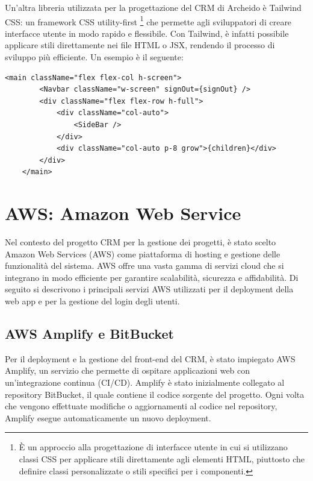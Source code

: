 \documentclass[target=bach,aauheader=,style=]{thud}
\begin{document}
\noindent Un'altra libreria utilizzata per la progettazione del CRM di Archeido è Tailwind CSS: un framework CSS utility-first \footnote{È un approccio alla progettazione di interfacce utente in cui si utilizzano classi CSS per applicare stili direttamente agli elementi HTML, piuttosto che definire classi personalizzate o stili specifici per i componenti.} che permette agli sviluppatori di creare interfacce utente in modo rapido e flessibile. Con Tailwind, è infatti possibile applicare stili direttamente nei file HTML o JSX, rendendo il processo di sviluppo più efficiente. Un esempio è il seguente:

\begin{lstlisting}[caption=Parte del file \texttt{app.tsx} del CRM]
    <main className="flex flex-col h-screen">
        <Navbar className="w-screen" signOut={signOut} />
        <div className="flex flex-row h-full">
            <div className="col-auto">
                <SideBar />
            </div>
            <div className="col-auto p-8 grow">{children}</div>
        </div>
    </main> 
\end{lstlisting}


\section{AWS: Amazon Web Service}
Nel contesto del progetto CRM per la gestione dei progetti, è stato scelto Amazon Web Services (AWS) come piattaforma di hosting e gestione delle funzionalità del sistema. AWS offre una vasta gamma di servizi cloud che si integrano in modo efficiente per garantire scalabilità, sicurezza e affidabilità. Di seguito si descrivono i principali servizi AWS utilizzati per il deployment della web app e per la gestione del login degli utenti.

\subsection{AWS Amplify e BitBucket}
Per il deployment e la gestione del front-end del CRM, è stato impiegato AWS Amplify, un servizio che permette di ospitare applicazioni web con un'integrazione continua (CI/CD). Amplify è stato inizialmente collegato al repository BitBucket, il quale contiene il codice sorgente del progetto. Ogni volta che vengono effettuate modifiche o aggiornamenti al codice nel repository, Amplify esegue automaticamente un nuovo deployment.
\end{document}
